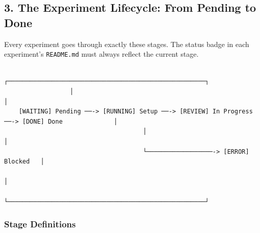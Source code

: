 \subsection{3. The Experiment Lifecycle: From Pending to
Done}\label{the-experiment-lifecycle-from-pending-to-done}

Every experiment goes through exactly these stages. The status badge in
each experiment's \texttt{README.md} must always
reflect the current stage.

\begin{verbatim}
                  ┌──────────────────────────────────────────────────────┐
                  │                                                      │
    [WAITING] Pending ──-> [RUNNING] Setup ──-> [REVIEW] In Progress ──-> [DONE] Done              │
                                      │                                  │
                                      └──────────────────-> [ERROR] Blocked   │
                                                                         │
                  └──────────────────────────────────────────────────────┘
\end{verbatim}

\subsubsection{Stage Definitions}\label{stage-definitions}

